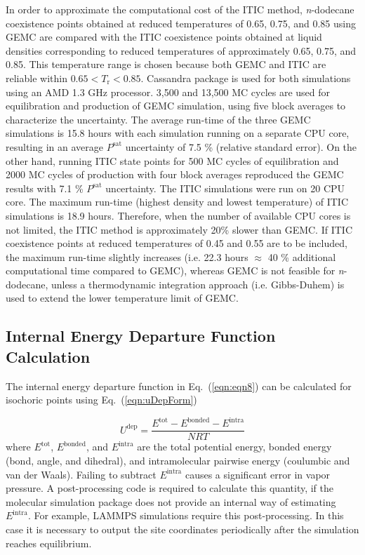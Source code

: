 \documentclass[5p,times]{elsarticle}
\begin{document}
In order to approximate the computational cost of the ITIC method, \textit{n}-dodecane  coexistence points obtained at reduced temperatures of 0.65, 0.75, and 0.85 using  GEMC are compared with the ITIC coexistence points obtained at liquid densities corresponding to reduced temperatures of approximately 0.65, 0.75, and 0.85. This temperature range is chosen because both  GEMC and ITIC are reliable within $0.65<T_\mathrm{r}<0.85$. Cassandra package is used for both simulations using an AMD 1.3 GHz processor. 3,500 and 13,500 MC cycles are used for equilibration and production of GEMC simulation, using five block averages to characterize the uncertainty. The average run-time of the three GEMC simulations is 15.8 hours with each simulation running on a separate CPU core, resulting in an average $P^\mathrm{sat}$ uncertainty of 7.5 \% (relative standard error). On the other hand, running ITIC state points for 500 MC cycles of equilibration and 2000 MC cycles of production with four block averages reproduced the GEMC results with 7.1 \% $P^\mathrm{sat}$ uncertainty. The ITIC simulations were run on 20 CPU core. The maximum run-time (highest density and lowest temperature) of ITIC simulations is 18.9 hours. Therefore, when the number of available CPU cores is not limited, the ITIC method is approximately 20\% slower than GEMC. If ITIC coexistence points at reduced temperatures of 0.45 and 0.55 are to be included, the maximum run-time slightly increases (i.e. 22.3 hours $\approx$ 40 \% additional computational time compared to GEMC), whereas GEMC is not feasible for \textit{n}-dodecane, unless a thermodynamic integration approach (i.e. Gibbs-Duhem) is used to extend the lower temperature limit of GEMC.


\subsection{Internal Energy Departure Function Calculation}\label{sec:udepCalc}
The internal energy departure function in Eq.~(\ref{eqn:eqn8}) can be calculated for isochoric points using Eq.~(\ref{eqn:uDepForm})

\begin{equation}
U^{\mathrm{dep}} = \frac{E^{\mathrm{tot}} - E^{\mathrm{bonded}} - E^{\mathrm{intra}}}{NRT}\label{eqn:uDepForm}
\end{equation}
where $E^{\mathrm{tot}}$, $E^{\mathrm{bonded}}$, and $E^{\mathrm{intra}}$ are the total potential energy, bonded energy (bond, angle, and dihedral), and intramolecular pairwise energy (coulumbic and van der Waals). Failing to subtract $E^{\mathrm{intra}}$ causes a significant error in vapor pressure. A post-processing code is required to calculate this quantity, if the molecular simulation package does not provide an internal way of estimating $E^{\mathrm{intra}}$. For example, LAMMPS simulations require this post-processing.  In this case it is necessary to output the site coordinates periodically after the simulation reaches equilibrium. 
\end{document}
